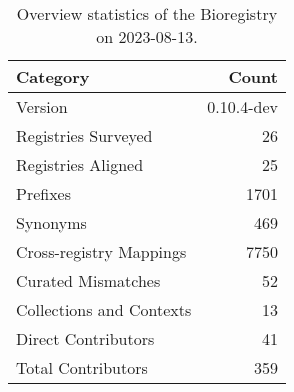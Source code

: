 \begin{table}
\caption{Overview statistics of the Bioregistry on 2023-08-13.}
\label{tab:bioregistry-summary}
\begin{tabular}{lr}
\toprule
Category & Count \\
\midrule
Version & 0.10.4-dev \\
Registries Surveyed & 26 \\
Registries Aligned & 25 \\
Prefixes & 1701 \\
Synonyms & 469 \\
Cross-registry Mappings & 7750 \\
Curated Mismatches & 52 \\
Collections and Contexts & 13 \\
Direct Contributors & 41 \\
Total Contributors & 359 \\
\bottomrule
\end{tabular}
\end{table}
